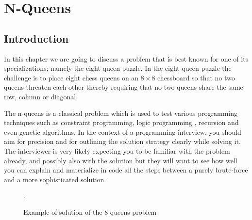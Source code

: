 %



\chapter{N-Queens}
\label{ch:nqueens}
\section*{Introduction}
In this chapter we are going to discuss a problem that is best known for one of its
specializations; namely the eight queen puzzle. 
In the eight queen puzzle the challenge is to place
eight chess queens on an $8 \times 8$ chessboard so that no two queens threaten each other thereby requiring that no two queens share the same row, column or diagonal.

The n-queens is a classical problem which is used to test various programming techniques such as constraint programming, logic
programming , recursion and even genetic algorithms. In the context of a programming interview, you
should aim for precision and for outlining the solution strategy clearly while solving it. 
The interviewer is very likely expecting you to be familiar with the problem already, and possibly also with the solution but they will want to see how well you can explain and materialize in code all the steps between a purely brute-force and a more sophisticated solution.

\begin{figure}
	 \centering 
	 \newgame
	 \def\myfen{4q3/6q1/3q4/q7/2q5/7q/5q2/1q6 w - - 0 1}
	 \chessboard[labelbottomformat=\arabic{filelabel}, %
	 showmover=false, %
	 setfen=\myfen] \caption{Example of solution of the $8$-queens problem}.
	  \label{fig:nqueens:chessboard}
\end{figure}


